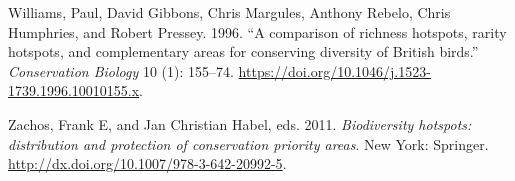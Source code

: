 \documentclass[
]{article}
\begin{document}
\leavevmode\hypertarget{ref-Williams1996}{}%
Williams, Paul, David Gibbons, Chris Margules, Anthony Rebelo, Chris Humphries, and Robert Pressey. 1996. ``A comparison of richness hotspots, rarity hotspots, and complementary areas for conserving diversity of British birds.'' \emph{Conservation Biology} 10 (1): 155--74. \url{https://doi.org/10.1046/j.1523-1739.1996.10010155.x}.

\leavevmode\hypertarget{ref-Zachos2011}{}%
Zachos, Frank E, and Jan Christian Habel, eds. 2011. \emph{Biodiversity hotspots: distribution and protection of conservation priority areas}. New York: Springer. \url{http://dx.doi.org/10.1007/978-3-642-20992-5}.
\end{document}
